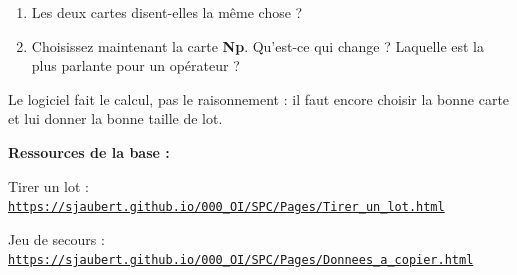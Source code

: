 \documentclass[10pt,a4paper]{article}
\begin{document}
\begin{enumerate}[label=\textcolor{cyan}{\textbf{Q\arabic*.}},leftmargin=22pt]
\item Les deux cartes disent-elles la même chose ?\reponse[1]
\item Choisissez maintenant la carte \textbf{Np}. Qu'est-ce qui change ? Laquelle est la plus parlante pour un opérateur ?\reponse[2]
\end{enumerate}
\begin{tcolorbox}[retenir]Le logiciel fait le calcul, pas le raisonnement : il faut encore choisir la bonne carte et lui donner la bonne taille de lot.\end{tcolorbox}
\vfill{\footnotesize\color{uimm}\textbf{Ressources de la base :}\par Tirer un lot : \href{https://sjaubert.github.io/000_OI/SPC/Pages/Tirer_un_lot.html}{\nolinkurl{https://sjaubert.github.io/000_OI/SPC/Pages/Tirer_un_lot.html}}\par Jeu de secours : \href{https://sjaubert.github.io/000_OI/SPC/Pages/Donnees_a_copier.html\#lots35}{\nolinkurl{https://sjaubert.github.io/000_OI/SPC/Pages/Donnees_a_copier.html}}}
\end{document}
